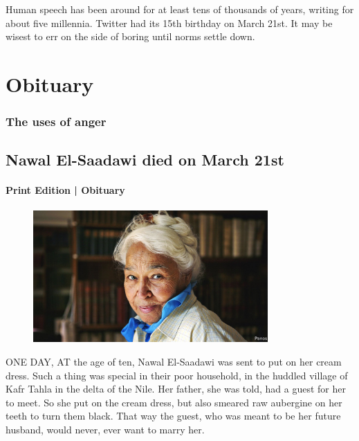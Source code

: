 \documentclass{article}
\begin{document}
Human speech has been around for at least tens of thousands of years, writing for about five millennia. Twitter had its 15th birthday on March 21st. It may be wisest to err on the side of boring until norms settle down. 
\clearpage
\section{Obituary }
\subsubsection{The uses of anger }
\subsection{Nawal El-Saadawi died on March 21st }
\paragraph{Print Edition | Obituary  \quad \color{gray}{Mar 27th 2021 }}
\begin{figure}[h]
\centering
\includegraphics[width=0.8\textwidth]{images/20210327_OBP001_0.jpg}
\end{figure}
\lettrine{O}NE DAY, AT the age of ten, Nawal El-Saadawi was sent to put on her cream dress. Such a thing was special in their poor household, in the huddled village of Kafr Tahla in the delta of the Nile. Her father, she was told, had a guest for her to meet. So she put on the cream dress, but also smeared raw aubergine on her teeth to turn them black. That way the guest, who was meant to be her future husband, would never, ever want to marry her. 
\end{document}
